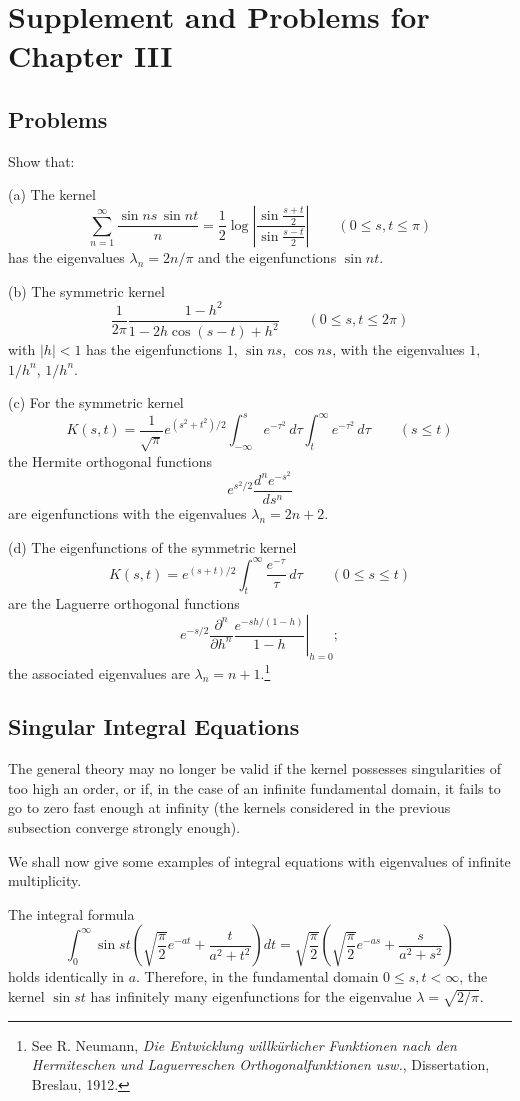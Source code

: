 \section{Supplement and Problems for Chapter III}
\subsection{Problems}
Show that:

(a) The kernel
\[
\sum_{n=1}^{\infty}\frac{\sin ns\,\sin nt}{n}
=\frac12\log\left|\frac{\sin\frac{s+t}{2}}{\sin\frac{s-t}{2}}\right|
\qquad (0\le s,t\le\pi)
\]
has the eigenvalues $\lambda_n=2n/\pi$ and the eigenfunctions $\sin nt$.

(b) The symmetric kernel
\[
\frac{1}{2\pi}\frac{1-h^2}{1-2h\cos(s-t)+h^2}
\qquad (0\le s,t\le2\pi)
\]
with $|h|<1$ has the eigenfunctions $1$, $\sin ns$, $\cos ns$, with the eigenvalues $1$, $1/h^n$, $1/h^n$.

(c) For the symmetric kernel
\[
K(s,t)=\frac{1}{\sqrt{\pi}}e^{(s^2+t^2)/2}
\int_{-\infty}^{s}e^{-\tau^2}\,d\tau
\int_t^{\infty}e^{-\tau^2}\,d\tau
\qquad (s\le t)
\]
the Hermite orthogonal functions
\[
e^{s^2/2}\frac{d^n e^{-s^2}}{ds^n}
\]
are eigenfunctions with the eigenvalues $\lambda_n=2n+2$.

(d) The eigenfunctions of the symmetric kernel
\[
K(s,t)=e^{(s+t)/2}\int_t^{\infty}\frac{e^{-\tau}}{\tau}\,d\tau
\qquad (0\le s\le t)
\]
are the Laguerre orthogonal functions
\[
e^{-s/2}
\left.
\frac{\partial^n}{\partial h^n}
\frac{e^{-sh/(1-h)}}{1-h}
\right|_{h=0};
\]
the associated eigenvalues are $\lambda_n=n+1$.\footnote{See R. Neumann, \emph{Die Entwicklung willk\"urlicher Funktionen nach den Hermiteschen und Laguerreschen Orthogonalfunktionen usw.}, Dissertation, Breslau, 1912.}

\subsection{Singular Integral Equations}
The general theory may no longer be valid if the kernel possesses singularities of too high an order, or if, in the case of an infinite fundamental domain, it fails to go to zero fast enough at infinity (the kernels considered in the previous subsection converge strongly enough).

We shall now give some examples of integral equations with eigenvalues of infinite multiplicity.

The integral formula
\[
\int_0^{\infty}\sin st\left(\sqrt{\frac{\pi}{2}}e^{-at}+\frac{t}{a^2+t^2}\right)dt
=\sqrt{\frac{\pi}{2}}\left(\sqrt{\frac{\pi}{2}}e^{-as}+\frac{s}{a^2+s^2}\right)
\]
holds identically in $a$. Therefore, in the fundamental domain $0\le s,t<\infty$, the kernel $\sin st$ has infinitely many eigenfunctions for the eigenvalue $\lambda=\sqrt{2/\pi}$.

